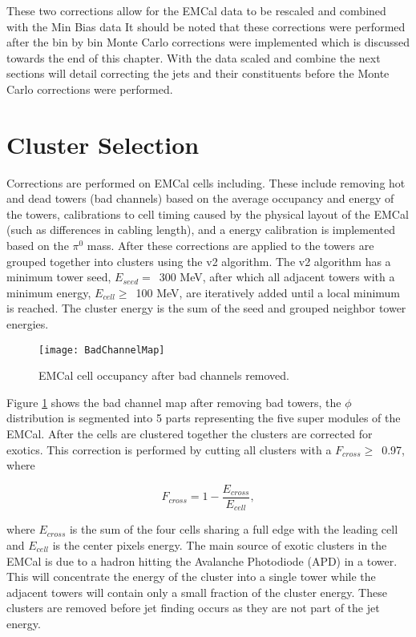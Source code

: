 These two corrections allow for the EMCal data to be rescaled and combined with the Min Bias data It should be noted that these corrections were performed after the bin by bin Monte Carlo corrections were implemented which is discussed towards the end of this chapter.  With the data scaled and combine the next sections will detail correcting the jets and their constituents before the Monte Carlo corrections were performed.


\section{Cluster Selection}
Corrections are performed on EMCal cells including.  These include removing hot and dead towers (bad channels) based on the average occupancy and energy of the towers, calibrations to cell timing caused by the physical layout of the EMCal (such as differences in cabling length), and a energy calibration is implemented based on the $\pi^{0}$ mass.  After these corrections are applied to the towers are grouped together into clusters using the v2 algorithm.  The v2 algorithm has a minimum tower seed, $E_{seed} = \,$ 300 MeV, after which all adjacent towers with a minimum energy, $E_{cell} \geq \,$ 100 MeV, are iteratively added until a local minimum is reached.  The cluster energy is the sum of the seed and grouped neighbor tower energies.   

\begin{figure}[h]
\texttt{[image: BadChannelMap]}
\centering
\caption{EMCal cell occupancy after bad channels removed.}
\label{fig:badchannel}
\end{figure}


\noindent
Figure \ref{fig:badchannel} shows the bad channel map after removing bad towers, the $\phi$ distribution is segmented into 5 parts representing the five super modules of the EMCal.  After the cells are clustered together the clusters are corrected for exotics.  This correction is performed by cutting all clusters with a $F_{cross} \geq \,$ 0.97, where

\begin{equation}
F_{cross} = 1 - \frac{ E_{cross} }{ E_{cell} },
\label{eq:Fcross}
\end{equation}

\noindent
where $E_{cross}$ is the sum of the four cells sharing a full edge with the leading cell and $E_{cell}$ is the center pixels energy.  The main source of exotic clusters in the EMCal is due to a hadron hitting the Avalanche Photodiode (APD) in a tower.  This will concentrate the energy of the cluster into a single tower while the adjacent towers will contain only a small fraction of the cluster energy.  These clusters are removed before jet finding occurs as they are not part of the jet energy.

